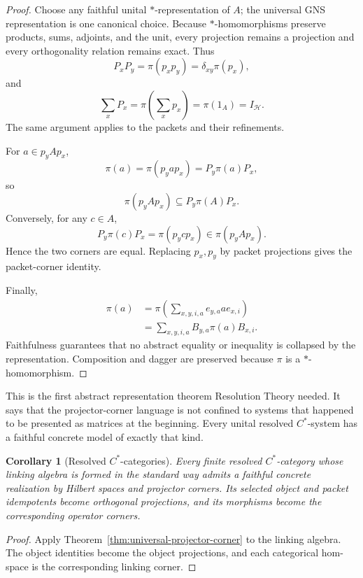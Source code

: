 \documentclass[11pt]{article}
\newtheorem{corollary}[theorem]{Corollary}
\theoremstyle{definition}
\theoremstyle{remark}
\begin{document}
\begin{proof}
Choose any faithful unital $*$-representation of $A$; the universal GNS representation is one canonical choice.  Because $*$-homomorphisms preserve products, sums, adjoints, and the unit, every projection remains a projection and every orthogonality relation remains exact.  Thus
\[
P_xP_y
=
\pi(p_xp_y)
=
\delta_{xy}\pi(p_x),
\]
and
\[
\sum_xP_x
=
\pi\left(\sum_xp_x\right)
=
\pi(1_A)
=
I_\mathcal H.
\]
The same argument applies to the packets and their refinements.

For $a\in p_yAp_x$,
\[
\pi(a)
=
\pi(p_yap_x)
=
P_y\pi(a)P_x,
\]
so
\[
\pi(p_yAp_x)
\subseteq
P_y\pi(A)P_x.
\]
Conversely, for any $c\in A$,
\[
P_y\pi(c)P_x
=
\pi(p_ycp_x)
\in
\pi(p_yAp_x).
\]
Hence the two corners are equal.  Replacing $p_x,p_y$ by packet projections gives the packet-corner identity.

Finally,
\begin{align*}
\pi(a)
&=
\pi\left(
\sum_{x,y,i,a}
e_{y,a}ae_{x,i}
\right)\\
&=
\sum_{x,y,i,a}
B_{y,a}\pi(a)B_{x,i}.
\end{align*}
Faithfulness guarantees that no abstract equality or inequality is collapsed by the representation.  Composition and dagger are preserved because $\pi$ is a $*$-homomorphism.
\end{proof}

This is the first abstract representation theorem Resolution Theory needed.  It says that the projector-corner language is not confined to systems that happened to be presented as matrices at the beginning.  Every unital resolved $C^*$-system has a faithful concrete model of exactly that kind.

\begin{corollary}[Resolved $C^*$-categories]
Every finite resolved $C^*$-category whose linking algebra is formed in the standard way admits a faithful concrete realization by Hilbert spaces and projector corners.  Its selected object and packet idempotents become orthogonal projections, and its morphisms become the corresponding operator corners.
\end{corollary}

\begin{proof}
Apply Theorem~\ref{thm:universal-projector-corner} to the linking algebra.  The object identities become the object projections, and each categorical hom-space is the corresponding linking corner.
\end{proof}
\end{document}
